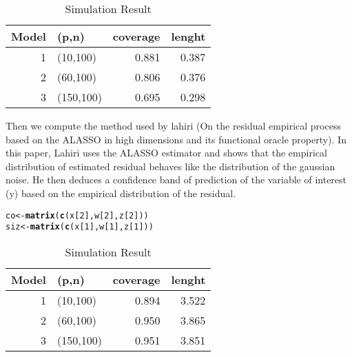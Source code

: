 \documentclass[11pt,oneside, a4paper]{amsart}\usepackage[]{graphicx}\usepackage[]{color}
\makeatletter
\newcommand{\hlnum}[1]{\textcolor[rgb]{0.686,0.059,0.569}{#1}}%
\newcommand{\hlstd}[1]{\textcolor[rgb]{0.345,0.345,0.345}{#1}}%
\newcommand{\hlkwb}[1]{\textcolor[rgb]{0.69,0.353,0.396}{#1}}%
\newcommand{\hlkwd}[1]{\textcolor[rgb]{0.737,0.353,0.396}{\textbf{#1}}}%
\newenvironment{kframe}{%
 \def\at@end@of@kframe{}%
 \ifinner\ifhmode%
  \def\at@end@of@kframe{\end{minipage}}%
  \begin{minipage}{\columnwidth}%
 \fi\fi%
 \def\FrameCommand##1{\hskip\@totalleftmargin \hskip-\fboxsep
 \colorbox{shadecolor}{##1}\hskip-\fboxsep
     \hskip-\linewidth \hskip-\@totalleftmargin \hskip\columnwidth}%
 \MakeFramed {\advance\hsize-\width
   \@totalleftmargin\z@ \linewidth\hsize
   \@setminipage}}%
 {\par\unskip\endMakeFramed%
 \at@end@of@kframe}
\newenvironment{knitrout}{}{} %
\makeatother
\begin{document}
\begin{table}[ht]
\centering
\caption{Simulation Result} 
\label{Test_table}
{\footnotesize
\begin{tabular}{rlrr}
  \toprule 
 Model & (p,n) & coverage & lenght \\
 \midrule 
    1 & (10,100) & 0.881 & 0.387 \\ 
     2 & (60,100) & 0.806 & 0.376 \\ 
     3 & (150,100) & 0.695 & 0.298 \\ 
   \bottomrule 
\end{tabular}
}
\end{table}



Then we compute the method used by lahiri (On the residual empirical process based on the ALASSO in high dimensions and its functional oracle property). In this paper, Lahiri uses the ALASSO estimator and shows that the empirical distribution of estimated residual behaves like the distribution of the gaussian noise. He then deduces a confidence band of prediction of the variable of interest (y) based on the empirical distribution of the residual.




\begin{knitrout}
\color{fgcolor}\begin{kframe}
\begin{alltt}
\hlstd{co}\hlkwb{<-}\hlkwd{matrix}\hlstd{(}\hlkwd{c}\hlstd{(x[}\hlnum{2}\hlstd{],w[}\hlnum{2}\hlstd{],z[}\hlnum{2}\hlstd{]))}
\hlstd{siz}\hlkwb{<-}\hlkwd{matrix}\hlstd{(}\hlkwd{c}\hlstd{(x[}\hlnum{1}\hlstd{],w[}\hlnum{1}\hlstd{],z[}\hlnum{1}\hlstd{]))}
\end{alltt}
\end{kframe}
\end{knitrout}



\begin{table}[ht]
\centering
\caption{Simulation Result} 
\label{Test_table}
{\footnotesize
\begin{tabular}{rlrr}
  \toprule 
 Model & (p,n) & coverage & lenght \\
 \midrule 
    1 & (10,100) & 0.894 & 3.522 \\ 
     2 & (60,100) & 0.950 & 3.865 \\ 
     3 & (150,100) & 0.951 & 3.851 \\ 
   \bottomrule 
\end{tabular}
}
\end{table}
\end{document}
